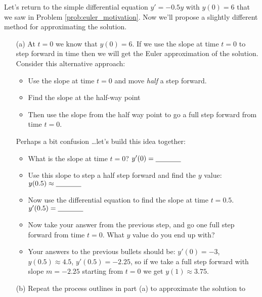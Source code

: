 \begin{problem}
    Let's return to the simple differential equation $y' = -0.5y$ with $y(0) = 6$ that we
    saw in Problem \ref{prob:euler_motivation}.  Now we'll propose a slightly different
    method for approximating the solution.
    \begin{enumerate}
        \item[(a)] At $t=0$ we know that $y(0)=6$.  If we use the slope at time $t=0$ to
            step forward in time then we will get the Euler approximation of the solution.
            Consider this alternative approach: 
            \begin{itemize}
                \item Use the slope at time $t=0$ and move {\it half} a step forward.  
                \item Find the slope at the half-way point
                \item Then use the slope from the half way point to go a full step forward
                    from time $t=0$.  
            \end{itemize} 
            Perhaps a bit confusion \ldots let's build this idea together:
            \begin{itemize}
                \item What is the slope at time $t=0$? $y'(0) =
                    \underline{\hspace{0.5in}}$
                \item Use this slope to step a half step forward and find the $y$ value:
                    $y(0.5) \approx \underline{\hspace{0.5in}}$
                \item Now use the differential equation to find the slope at time $t=0.5$.
                    $y'(0.5) = \underline{\hspace{0.5in}}$
                \item Now take your answer from the previous step, and go one full step
                    forward from time $t=0$.  What $y$ value do you end up with? 
                \item Your answers to the previous bullets should be: $y'(0) = -3$, $y(0.5) \approx
                    4.5$, $y'(0.5) = -2.25$, so if we take a full step forward with slope
                    $m=-2.25$ starting from $t=0$ we get $y(1) \approx 3.75$.
            \end{itemize}
        \item[(b)] Repeat the process outlines in part (a) to approximate the solution to

\end{enumerate}
\end{problem}
